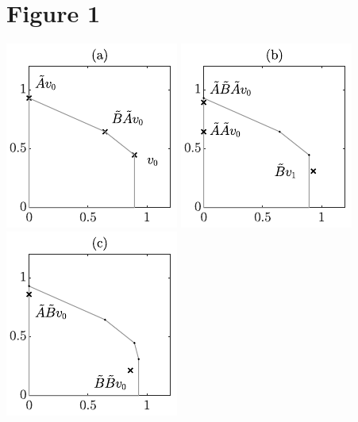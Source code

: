 \newpage
\section{Figure 1}
\begin{center}
\includegraphics{./graphics/invpoly_1}
\includegraphics{./graphics/invpoly_2}
\includegraphics{./graphics/invpoly_3}
\end{center}

